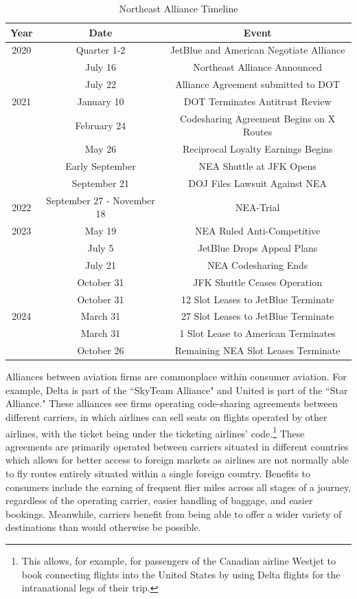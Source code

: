 \documentclass{article}
\begin{document}
    \begin{table}[tb]
		\caption{Northeast Alliance Timeline}
		\label{tab:NEA_Timeline}
		\begin{center}
			\begin{tabular}{ccc}
				\hline
				Year & Date & Event \\
				\hline
				2020 & Quarter 1-2 & JetBlue and American Negotiate Alliance \\ 
				& July 16 & Northeast Alliance Announced \\
				& July 22 & Alliance Agreement submitted to DOT \\
				\hline 
				2021 & January 10 & DOT Terminates Antitrust Review \\
				& February 24 & Codesharing Agreement Begins on {X} Routes \\
				& May 26 & Reciprocal Loyalty Earnings Begins \\
				& Early September & NEA Shuttle at JFK Opens \\
				& September 21 & DOJ Files Lawsuit Against NEA \\  
				\hline
				2022 & September 27 - November 18 & NEA-Trial \\
				\hline 
				2023 & May 19 & NEA Ruled Anti-Competitive \\
				& July 5 & JetBlue Drops Appeal Plans \\
				& July 21 & NEA Codesharing Ends \\
				& October 31 & JFK Shuttle Ceases Operation\\
				& October 31 & 12 Slot Leases to JetBlue Terminate \\
				\hline 
				2024 &  March 31  & 27 Slot Leases to JetBlue Terminate \\ 
				& March 31 & 1 Slot Lease to American Terminates \\
				& October 26 & Remaining NEA Slot Leases Terminate				 \end{tabular}
		\end{center}
	\end{table}

	Alliances between aviation firms are commonplace within consumer aviation. For example, Delta is part of the ``SkyTeam Alliance" and United is part of the ``Star Alliance." These alliances see firms operating code-sharing agreements between different carriers, in which airlines can sell seats on flights operated by other airlines, with the ticket being under the ticketing airlines' code.\footnote{This allows, for example, for passengers of the Canadian airline Westjet to book connecting flights into the United States by using Delta flights for the intranational legs of their trip.}  These agreements are primarily operated between carriers situated in different countries which allows for better access to foreign markets as airlines are not normally able to fly routes entirely situated within a single foreign country. Benefits to consumers include the earning of frequent flier miles across all stages of a journey, regardless of the operating carrier, easier handling of baggage, and easier bookings. Meanwhile, carriers benefit from being able to offer a wider variety of destinations than would otherwise be possible.
	
\end{document}

